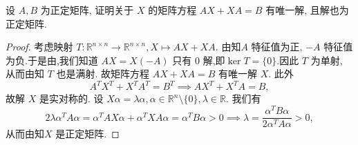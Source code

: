 \documentclass[../../main.tex]{subfiles}%
\begin{document}
\begin{example}
设 \( A,B \) 为正定矩阵, 证明关于 \( X \) 的矩阵方程 \( AX + XA = B \) 有唯一解, 且解也为正定矩阵.
\end{example}
\begin{proof}

考虑映射 \( T: \mathbb{R}^{n \times n} \to \mathbb{R}^{n \times n}, X \mapsto AX + XA \). 由知\( A \) 特征值为正, \( -A \) 特征值为负.于是由,我们知道 \( AX = X(-A) \) 只有 0 解,即$\ker T=\{0\}$.因此 \( T \) 为单射, 从而由知 \( T \) 也是满射. 故矩阵方程 \( AX + XA = B \) 有唯一解 \( X \). 此外
\[
A^T X^T + X^T A^T = B^T \implies AX^T + X^T A = B,
\]
故解 \( X \) 是实对称的. 设 \( X\alpha = \lambda\alpha, \alpha \in \mathbb{R}^n \setminus \{0\}, \lambda \in \mathbb{R} \). 我们有
\[
2\lambda\alpha^T A\alpha = \alpha^T AX\alpha + \alpha^T XA\alpha = \alpha^T B\alpha > 0 \implies \lambda = \frac{\alpha^T B\alpha}{2\alpha^T A\alpha} > 0,
\]
从而由知\( X \) 是正定矩阵.

\end{proof}
\end{document}
